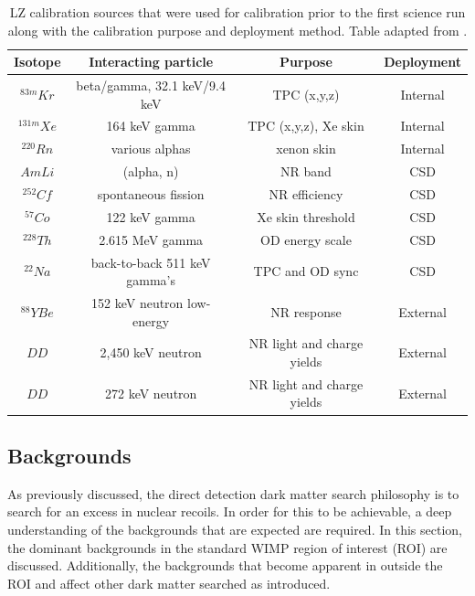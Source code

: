 \begin{table}[!htbp]
    \centering
    \begin{tabular}{c|c|c|c}
    \hline
    Isotope       & Interacting particle         & Purpose                    & Deployment \\
    \hline
    ${}^{83m}Kr $ & beta/gamma, 32.1 keV/9.4 keV & TPC (x,y,z)                & Internal  \\
    ${}^{131m}Xe$ & 164 keV gamma                & TPC (x,y,z), Xe skin       & Internal  \\ 
    ${}^{220}Rn $ & various alphas               & xenon skin                 & Internal  \\
    $AmLi       $ & (alpha, n)                   & NR band                    & CSD       \\
    ${}^{252}Cf $ & spontaneous fission          & NR efficiency              & CSD       \\
    ${}^{57}Co  $ & 122 keV gamma                & Xe skin threshold          & CSD       \\
    ${}^{228}Th $ & 2.615 MeV gamma              & OD energy scale            & CSD       \\
    ${}^{22}Na  $ & back-to-back 511 keV gamma’s & TPC and OD sync            & CSD       \\
    ${}^{88}Y Be$ & 152 keV neutron low-energy   & NR response                & External  \\
    $DD         $ & 2,450 keV neutron            & NR light and charge yields & External  \\
    $DD         $ & 272 keV neutron              & NR light and charge yields & External
    \end{tabular}
    \caption{LZ calibration sources that were used for calibration prior to the first science run along with the calibration purpose and deployment method. Table adapted from \cite{LZ_TechnicalDesignReview_ref}.}
    \label{tab:LZ_Used_Calibration_Sources}
\end{table}



\subsection{Backgrounds}
\label{sec:lz_backgrounds}
\par
As previously discussed, the direct detection dark matter search philosophy is to search for an excess in nuclear recoils.
In order for this to be achievable, a deep understanding of the backgrounds that are expected are required.
In this section, the dominant backgrounds in the standard WIMP region of interest (ROI) are discussed.
Additionally, the backgrounds that become apparent in outside the ROI and affect other dark matter searched as introduced.

